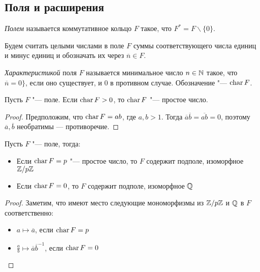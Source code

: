 \subsection{Поля и расширения}

\begin{definition}
	\textit{Полем} называется коммутативное кольцо $F$ такое, что $F^* = F \backslash \{0\}$.
\end{definition}

\begin{note}
	Будем считать целыми числами в поле $F$ суммы соответствующего числа единиц и минус единиц и обозначать их через $\overline{n} \in F$.
\end{note}

\pagebreak

\begin{definition}
	\textit{Характеристикой} поля $F$ называется минимальное число $n \in \mathbb{N}$ такое, что $\overline{n} = 0\}$, если оно существует, и $0$ в противном случае. Обозначение "--- $\operatorname{char}{F}$.
\end{definition}

\begin{proposition}
	Пусть $F$ "--- поле. Если $\operatorname{char}{F} > 0$, то $\operatorname{char}{F}$ "--- простое число.
\end{proposition}

\begin{proof}
	Предположим, что $\operatorname{char}{F} = ab$, где $a, b > 1$. Тогда $\overline{a}\overline{b} = \overline{ab} = 0$, поэтому $\overline{a}, \overline{b}$ необратимы --- противоречие.
\end{proof}

\begin{theorem}
	Пусть $F$ "--- поле, тогда:
	\begin{itemize}
		\item Если $\operatorname{char}{F} = p$ "--- простое число, то $F$ содержит подполе, изоморфное $\mathbb{Z} / p\mathbb{Z}$
		\item Если $\operatorname{char}{F} = 0$, то $F$ содержит подполе, изоморфное $\mathbb{Q}$
	\end{itemize}
\end{theorem}

\begin{proof}
	Заметим, что имеют место следующие мономорфизмы из $\mathbb{Z} / p\mathbb{Z}$ и $\mathbb{Q}$ в $F$ соответственно:
	\begin{itemize}
		\item $a \mapsto \overline{a}$, если $\operatorname{char}{F} = p$
		\item $\frac{a}{b} \mapsto \overline{a}\overline{b}^{-1}$, если $\operatorname{char}{F} = 0$\qedhere
	\end{itemize}
\end{proof}

